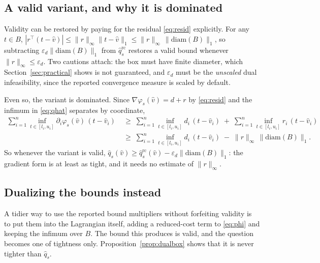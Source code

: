 \documentclass[11pt]{article}
\theoremstyle{plain}
\theoremstyle{remark}
\newcommand{\vhat}{\hat{v}}
\newcommand{\qhat}{\hat{q}}
\begin{document}
\subsection{A valid variant, and why it is dominated}

Validity can be restored by paying for the residual \eqref{eq:resid} explicitly.
For any $t \in B$,
$|r^{\top}(t - \vhat)| \le \|r\|_{\infty} \|t - \vhat\|_1
   \le \|r\|_{\infty} \,\|\mathrm{diam}(B)\|_1$,
so subtracting $\varepsilon_d \|\mathrm{diam}(B)\|_1$ from
$\qhat_s^{\mathrm{rc}}$ restores a valid bound whenever
$\|r\|_{\infty} \le \varepsilon_d$.  Two cautions attach: the box must have
finite diameter, which Section~\ref{sec:practical} shows is not guaranteed, and
$\varepsilon_d$ must be the \emph{unscaled} dual infeasibility, since the
reported convergence measure is scaled by default.

Even so, the variant is dominated.  Since
$\nabla \varphi_s(\vhat) = d + r$ by \eqref{eq:resid} and the infimum in
\eqref{eq:qhat} separates by coordinate,
\[
  \begin{aligned}
  \sum_{i=1}^{n} \inf_{t \in [l_i,u_i]} \partial_i \varphi_s(\vhat)\,(t - \vhat_i)
  &\;\ge\; \sum_{i=1}^{n} \inf_{t \in [l_i,u_i]} d_i\,(t - \vhat_i)
     \;+\; \sum_{i=1}^{n} \inf_{t \in [l_i,u_i]} r_i\,(t - \vhat_i) \\
  &\;\ge\; \sum_{i=1}^{n} \inf_{t \in [l_i,u_i]} d_i\,(t - \vhat_i)
     \;-\; \|r\|_{\infty} \,\|\mathrm{diam}(B)\|_1 .
  \end{aligned}
\]
So whenever the variant is valid,
$\qhat_s(\vhat) \ge \qhat_s^{\mathrm{rc}}(\vhat) - \varepsilon_d
\|\mathrm{diam}(B)\|_1$: the gradient form is at least as tight, and it needs no
estimate of $\|r\|_{\infty}$.

\subsection{Dualizing the bounds instead}

A tidier way to use the reported bound multipliers without forfeiting validity
is to put them into the Lagrangian itself, adding a reduced-cost term to
\eqref{eq:phi} and keeping the infimum over $B$.  The bound this produces is
valid, and the question becomes one of tightness only.
Proposition~\ref{prop:dualbox} shows that it is never tighter than $\qhat_s$.
\end{document}
